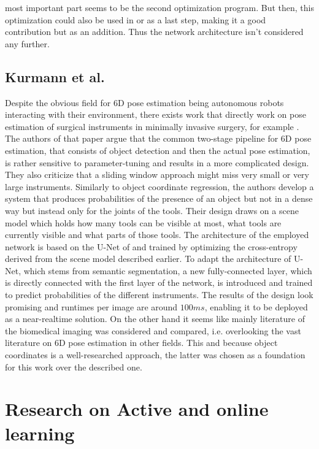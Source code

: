 most important part seems to be the second optimization program. But then, this optimization could also be used in \cite{brachmann2} or \cite{bb8} as a last step, making it a good contribution but as an addition. Thus the network architecture isn’t considered any further.

\subsection{Kurmann et al.}

Despite the obvious field for 6D pose estimation being autonomous robots interacting with their environment, there exists work that directly work on pose estimation of surgical instruments in minimally invasive surgery, for example \cite{kurmann}. The authors of that paper argue that the common two-stage pipeline for 6D pose estimation, that consists of object detection and then the actual pose estimation, is rather sensitive to parameter-tuning and results in a more complicated design. They also criticize that a sliding window approach might miss very small or very large instruments. Similarly to object coordinate regression, the authors develop a system that produces probabilities of the presence of an object but not in a dense way but instead only for the joints of the tools. Their design draws on a scene model which holds how many tools can be visible at most, what tools are currently visible and what parts of those tools. The architecture of the employed network is based on the U-Net of \cite{oronneberger} and trained by optimizing the cross-entropy derived from the scene model described earlier. To adapt the architecture of U-Net, which stems from semantic segmentation, a new fully-connected layer, which is directly connected with the first layer of the network, is introduced and trained to predict probabilities of the different instruments. The results of the design look promising and runtimes per image are around $100 ms$, enabling it to be deployed as a near-realtime solution. On the other hand it seems like mainly literature of the biomedical imaging was considered and compared, i.e. overlooking the vast literature on 6D pose estimation in other fields. This and because object coordinates is a well-researched approach, the latter was chosen as a foundation for this work over the described one. 

\section{Research on Active and online learning}

